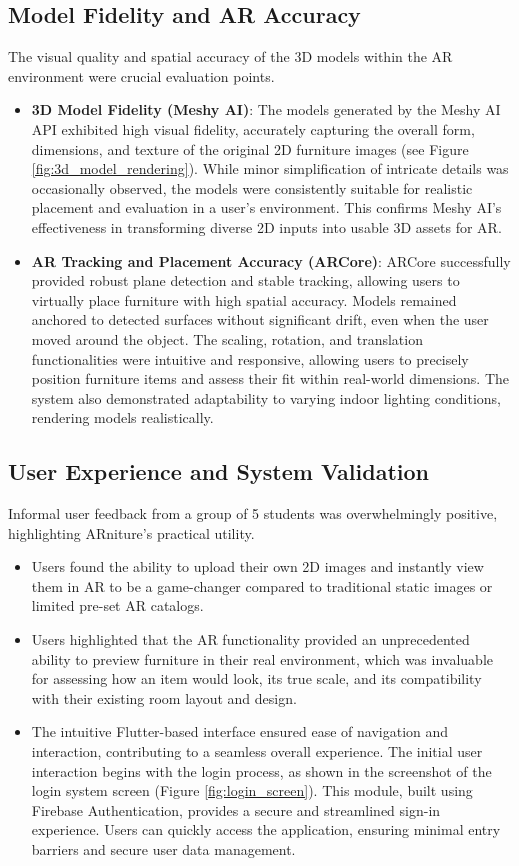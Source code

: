 \documentclass[12pt, a4paper]{article}
\begin{document}
\subsection{Model Fidelity and AR Accuracy}
The visual quality and spatial accuracy of the 3D models within the AR environment were crucial evaluation points.
\begin{itemize}
    \item \textbf{3D Model Fidelity (Meshy AI)}: The models generated by the Meshy AI API exhibited high visual fidelity, accurately capturing the overall form, dimensions, and texture of the original 2D furniture images (see Figure \ref{fig:3d_model_rendering}). While minor simplification of intricate details was occasionally observed, the models were consistently suitable for realistic placement and evaluation in a user's environment. This confirms Meshy AI's effectiveness in transforming diverse 2D inputs into usable 3D assets for AR.
    \item \textbf{AR Tracking and Placement Accuracy (ARCore)}: ARCore successfully provided robust plane detection and stable tracking, allowing users to virtually place furniture with high spatial accuracy. Models remained anchored to detected surfaces without significant drift, even when the user moved around the object. The scaling, rotation, and translation functionalities were intuitive and responsive, allowing users to precisely position furniture items and assess their fit within real-world dimensions. The system also demonstrated adaptability to varying indoor lighting conditions, rendering models realistically.
\end{itemize}

\subsection{User Experience and System Validation}
Informal user feedback from a group of 5 students was overwhelmingly positive, highlighting ARniture's practical utility.
\begin{itemize}
    \item Users found the ability to upload their own 2D images and instantly view them in AR to be a game-changer compared to traditional static images or limited pre-set AR catalogs.
    \item Users highlighted that the AR functionality provided an unprecedented ability to preview furniture in their real environment, which was invaluable for assessing how an item would look, its true scale, and its compatibility with their existing room layout and design.
    \item The intuitive Flutter-based interface ensured ease of navigation and interaction, contributing to a seamless overall experience. The initial user interaction begins with the login process, as shown in the screenshot of the login system screen (Figure \ref{fig:login_screen}). This module, built using Firebase Authentication, provides a secure and streamlined sign-in experience. Users can quickly access the application, ensuring minimal entry barriers and secure user data management.
\end{itemize}
\end{document}
